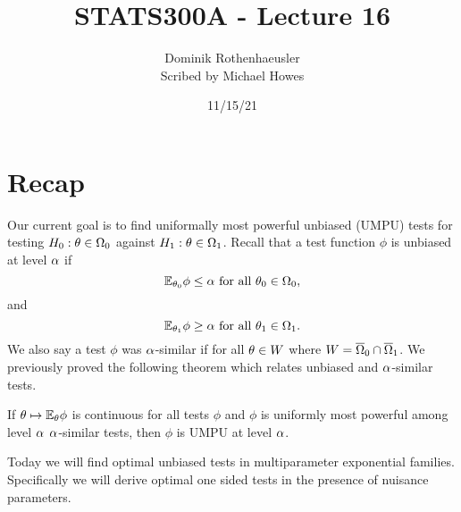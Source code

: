 




\title{STATS300A - Lecture 16}
\author{Dominik Rothenhaeusler\\ Scribed by Michael Howes}
\date{11/15/21}

\pagestyle{fancy}
\fancyhf{}


\maketitle
\tableofcontents
\section{Recap}
Our current goal is to find uniformally most powerful unbiased (UMPU) tests for testing $H_0 : {\theta} \in {{\Omega}}_0$ against $H_1 : {\theta} \in {{\Omega}}_1$. Recall that a test function $\phi$ is unbiased at level ${\alpha}$ if 
\[{\mathbb{E}}_{{\theta}_0}\phi \le {\alpha} \text{ for all } {\theta}_0 \in {{\Omega}}_0,\]
and 
\[{\mathbb{E}}_{{\theta}_1}\phi \ge {\alpha} \text{ for all } {\theta}_1 \in {{\Omega}}_1. \]
We also say a test $\phi$ was ${\alpha}$-similar if for all ${\theta} \in W$ where $W = \overline{{{\Omega}}}_0 \cap \overline{{{\Omega}}}_1$. We previously proved the following theorem which relates unbiased and ${\alpha}$-similar tests.
\begin{thrm}[TSH 4.11]
    If ${\theta} \mapsto {\mathbb{E}}_{\theta} \phi$ is continuous for all tests $\phi$ and $\phi$ is uniformly most powerful among level ${\alpha}$ ${\alpha}$-similar tests, then $\phi$ is UMPU at level ${\alpha}$. 
\end{thrm}
Today we will find optimal unbiased tests in multiparameter exponential families. Specifically we will derive optimal one sided tests in the presence of nuisance parameters.
